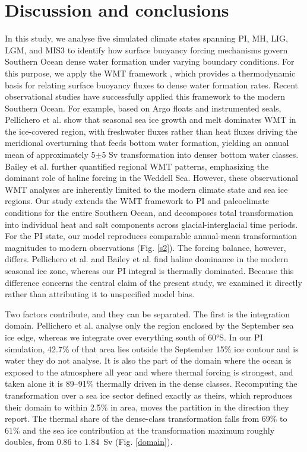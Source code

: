 \documentclass[pdflatex,sn-nature]{sn-jnl}
\begin{document}


\section{Discussion and conclusions}

In this study, we analyse five simulated climate states spanning PI, MH, LIG, LGM, and MIS3 to identify how surface buoyancy forcing mechanisms govern Southern Ocean dense water formation under varying boundary conditions. For this purpose, we apply the WMT framework \cite{Walin1982,Groeskamp2019,drake2025water}, which  provides a thermodynamic basis for relating surface buoyancy fluxes to dense water formation rates. Recent observational studies have successfully applied this framework to the modern Southern Ocean. For example, based on Argo floats and instrumented seals, Pellichero et al. \cite{Pellichero2018} show that seasonal sea ice growth and melt dominates WMT in the ice-covered region, with freshwater fluxes rather than heat fluxes driving the meridional overturning that feeds bottom water formation, yielding an annual mean of approximately 5$\pm$5 Sv transformation into denser bottom water classes. Bailey et al. \cite{Bailey2023} further quantified regional WMT patterns, emphasizing the dominant role of haline forcing in the Weddell Sea. However, these observational WMT analyses are inherently limited to the modern climate state and sea ice regions. Our study extends the WMT framework to PI and paleoclimate conditions for the entire Southern Ocean, and decomposes total transformation into individual heat and salt components across glacial-interglacial time periods. For the PI state, our model reproduces comparable annual-mean transformation magnitudes to modern observations (Fig. \ref{s2}). The forcing balance, however, differs. Pellichero et al. \cite{Pellichero2018} and Bailey et al. \cite{Bailey2023} find haline dominance in the modern seasonal ice zone, whereas our PI integral is thermally dominated. Because this difference concerns the central claim of the present study, we examined it directly rather than attributing it to unspecified model bias.

Two factors contribute, and they can be separated. The first is the integration domain. Pellichero et al. analyse only the region enclosed by the September sea ice edge, whereas we integrate over everything south of 60°S. In our PI simulation, 42.7\% of that area lies outside the September 15\% ice contour and is water they do not analyse. It is also the part of the domain where the ocean is exposed to the atmosphere all year and where thermal forcing is strongest, and taken alone it is 89--91\% thermally driven in the dense classes. Recomputing the transformation over a sea ice sector defined exactly as theirs, which reproduces their domain to within 2.5\% in area, moves the partition in the direction they report. The thermal share of the dense-class transformation falls from 69\% to 61\% and the sea ice contribution at the transformation maximum roughly doubles, from 0.86 to 1.84~Sv (Fig. \ref{domain}).
\end{document}
